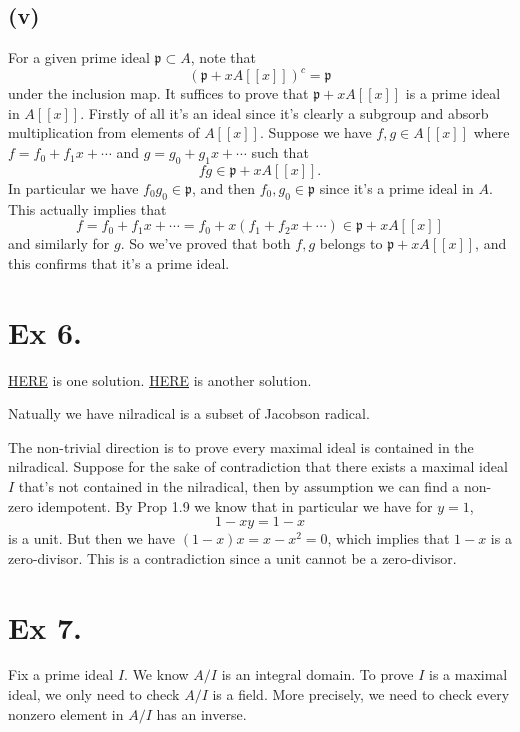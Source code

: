 \subsection{(v)} 

For a given prime ideal $\mathfrak p\subset A$, note that 
$$(\mathfrak p+xA[[x]])^c=\mathfrak p$$ under the inclusion map. It suffices to prove that $\mathfrak p+xA[[x]]$ is a prime ideal in $A[[x]]$. Firstly of all it's an ideal since it's clearly a subgroup and absorb multiplication from elements of $A[[x]]$. Suppose we have $f,g\in A[[x]]$ where $f=f_0+f_1x+\cdots$ and $g=g_0+g_1x+\cdots$ such that 
$$fg\in \mathfrak p+xA[[x]].$$
In particular we have $f_0g_0\in \mathfrak p$, and then $f_0,g_0\in \mathfrak p$ since it's a prime ideal in $A$. This actually implies that 
$$f=f_0+f_1x+\cdots=f_0+x(f_1+f_2x+\cdots)\in \mathfrak p+xA[[x]]$$ and similarly for $g$. So we've proved that both $f,g$ belongs to $\mathfrak p+xA[[x]]$, and this confirms that it's a prime ideal.



\section{Ex 6.}

\href{https://math.stackexchange.com/questions/2816529/check-my-proof-that-the-nilradical-and-the-jacobson-radical-are-equal-am-1-6}{HERE} is one solution. \href{https://math.stackexchange.com/questions/925332/atiyah-macdonald-problem-6-of-chapter-1  }{HERE} is another solution.

Natually we have nilradical is a subset of Jacobson radical.

The non-trivial direction is to prove every maximal ideal is contained in the nilradical. Suppose for the sake of contradiction that there exists a maximal ideal $I$ that's not contained in the nilradical, then by assumption we can find a non-zero idempotent.
By Prop 1.9 we know that in particular we 
have for $y=1$,
$$1-xy=1-x$$ is a unit. But then we have $(1-x)x=x-x^2=0$, which implies that $1-x$ is a zero-divisor. This is a contradiction since a unit cannot be a zero-divisor. \



\section{Ex 7.}\label{Chap 1 Ex 7.}

Fix a prime ideal $I$.
We know $A/I$ is an integral domain. To prove $I$ is a maximal ideal, we only need to check $A/I$ is a field. More precisely, we need to check every nonzero element in $A/I$ has an inverse.\\

